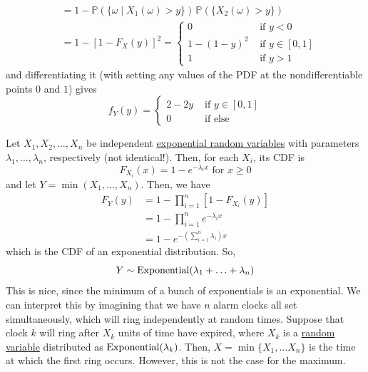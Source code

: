 \begin{example}[Uniforms]
\begin{align*}
      & = 1 - \mathbb{P}(\{\omega \mid X_1 (\omega) > y\}) \, \mathbb{P}(\{ X_2 (\omega) > y \}) \\ 
      & = 1 - [1 - F_X (y)]^2 = \begin{cases} 0 & \text{ if } y < 0 \\
      1 - (1 - y)^2 & \text{ if } y \in [0, 1] \\
      1 & \text{ if } y > 1 \end{cases} 
    \end{align*}
    and differentiating it (with setting any values of the PDF at the nondifferentiable points $0$ and $1$) gives 
    \begin{equation}
      f_Y (y) = \begin{cases} 2 - 2y & \text{ if } y \in [0, 1] \\
      0 & \text{ if else} \end{cases}
    \end{equation}
  \end{example}

  \begin{example}[Exponentials]
    \label{ex:exponentials}
    Let $X_1, X_2, \ldots, X_n$ be independent \hyperref[def:exponential-random-variable]{exponential random variables} with parameters $\lambda_1, \ldots, \lambda_n$, respectively (not identical!). Then, for each $X_i$, its CDF is 
    \begin{equation}
      F_{X_i} (x) = 1 - e^{-\lambda_i x} \text{ for } x \geq 0
    \end{equation}
    and let $Y = \min(X_1, \ldots, X_n)$. Then, we have 
    \begin{align*}
      F_Y (y) & = 1 - \prod_{i=1}^n [ 1 - F_{X_i} (y)] \\
      & = 1 - \prod_{i=1}^n e^{-\lambda_i x} \\
      & = 1 - e^{- ( \sum_{i=1}^n \lambda_i ) x}
    \end{align*}
    which is the CDF of an exponential distribution. So, 
    \begin{equation}
      Y \sim \operatorname{Exponential}(\lambda_1 + \ldots + \lambda_n)
    \end{equation}
    This is nice, since the minimum of a bunch of exponentials is an exponential. We can interpret this by imagining that we have $n$ alarm clocks all set simultaneously, which will ring independently at random times. Suppose that clock $k$ will ring after $X_k$ units of time have expired, where $X_k$ is a \hyperref[def:random-variable]{random variable} distributed as $\operatorname{Exponential}(\lambda_k)$. Then, $X = \min\{X_1, \ldots X_n\}$ is the time at which the first ring occurs. However, this is not the case for the maximum. 
  \end{example}

